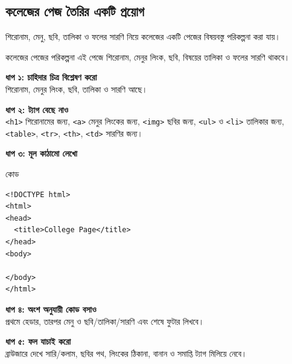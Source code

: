 \begin{center}
\end{center}

\subsection{কলেজের পেজ তৈরির একটি প্রয়োগ}

শিরোনাম, মেনু, ছবি, তালিকা ও ফলের সারণি নিয়ে কলেজের একটি পেজের বিষয়বস্তু পরিকল্পনা করা যায়।

\begin{examplebox}{কলেজের পেজের পরিকল্পনা}
এই পেজে শিরোনাম, মেনুর লিংক, ছবি, বিষয়ের তালিকা ও ফলের সারণি থাকবে।

\textbf{ধাপ ১: চাহিদার চিত্র বিশ্লেষণ করো}\\
শিরোনাম, মেনুর লিংক, ছবি, তালিকা ও সারণি আছে।

\textbf{ধাপ ২: ট্যাগ বেছে নাও}\\
\texttt{<h1>} শিরোনামের জন্য, \texttt{<a>} মেনুর লিংকের জন্য, \texttt{<img>} ছবির জন্য, \texttt{<ul>} ও \texttt{<li>} তালিকার জন্য, \texttt{<table>}, \texttt{<tr>}, \texttt{<th>}, \texttt{<td>} সারণির জন্য।

\textbf{ধাপ ৩: মূল কাঠামো লেখো}\\
\begin{examplebox}{কোড}
\begin{verbatim}
<!DOCTYPE html>
<html>
<head>
  <title>College Page</title>
</head>
<body>

</body>
</html>
\end{verbatim}
\end{examplebox}

\textbf{ধাপ ৪: অংশ অনুযায়ী কোড বসাও}\\
প্রথমে হেডার, তারপর মেনু ও ছবি/তালিকা/সারণি এবং শেষে ফুটার লিখবে।

\textbf{ধাপ ৫: ফল যাচাই করো}\\
ব্রাউজারে দেখে সারি/কলাম, ছবির পথ, লিংকের ঠিকানা, বানান ও সমাপ্তি ট্যাগ মিলিয়ে নেবে।
\end{examplebox}


